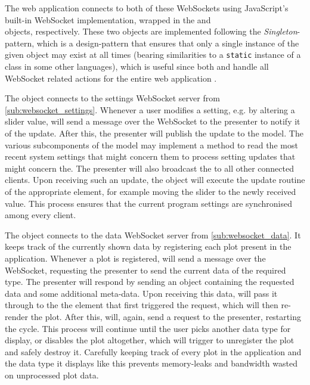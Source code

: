 \documentclass[a4paper, openany, oneside]{memoir}
\begin{document}
The web application connects to both of these WebSockets using JavaScript's built-in WebSocket implementation, wrapped in the  and \\ objects, respectively. These two objects are implemented following the \emph{Singleton}-pattern, which is a design-pattern that ensures that only a single instance of the given object may exist at all times (bearing similarities to a \texttt{static} instance of a class in some other languages), which is useful since both  and  handle all WebSocket related actions for the entire web application \cite[127]{designpatterns}.

The  object connects to the settings WebSocket server from \cref{sub:websocket_settings}. Whenever a user modifies a setting, e.g. by altering a slider value,  will send a message over the WebSocket to the presenter to notify it of the update.
After this, the presenter will publish the update to the model. The various subcomponents of the model may implement a method to read the most recent system settings that might concern them to process setting updates that might concern the.
The presenter will also broadcast the to all other connected clients. Upon receiving such an update, the  object will execute the update routine of the appropriate element, for example moving the slider to the newly received value. This process ensures that the current program settings are synchronised among every client.

The  object connects to the data WebSocket server from \cref{sub:websocket_data}. It keeps track of the currently shown data by registering each plot present in the application. Whenever a plot is registered,  will send a message over the WebSocket, requesting the presenter to send the current data of the required type. The presenter will respond by sending an object containing the requested data and some additional meta-data. Upon receiving this data,  will pass it through to the the element that first triggered the request, which will then re-render the plot. After this,  will, again, send a request to the presenter, restarting the cycle. This process will continue until the user picks another data type for display, or disables the plot altogether, which will trigger  to unregister the plot and safely destroy it. Carefully keeping track of every plot in the application and the data type it displays like this prevents memory-leaks and bandwidth wasted on unprocessed plot data.
\end{document}
